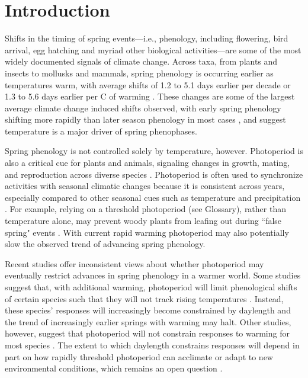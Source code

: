 \documentclass{article}
\begin{document}
\section*{Introduction}
\par Shifts in the timing of spring events---i.e., phenology, including flowering, bird arrival, egg hatching and myriad other biological activities---are some of the most widely documented signals of climate change. Across taxa, from plants and insects to mollusks and mammals, spring phenology is occurring earlier as temperatures warm, with average shifts of 1.2 to 5.1 days earlier per decade \citep{bradley1999,parmesan2003, root2003,poloczanska2013} or 1.3 to 5.6 days earlier per \degree C of warming \citep{Wolkovich:2012n,polgar2013}. These changes are some of the largest average climate change induced shifts observed, with early spring phenology shifting more rapidly than later season phenology in most cases \citep{bradley1999,menzel2006}, and suggest temperature is a major driver of spring phenophases.

\par Spring phenology is not controlled solely by temperature, however. Photoperiod is also a critical cue for plants and animals, signaling changes in growth, mating, and reproduction across diverse species \citep[e.g.,][]{Howe:1996,flynn2018,solbakken1994,mcallan2006,lagercrantz2009}. Photoperiod is often used to synchronize activities with seasonal climatic changes \citep[e.g.,][]{Hsu:2011,Singh:2017,Basler:2012} because it is consistent across years, especially compared to other seasonal cues such as temperature and precipitation \citep{saikkonen2012}. For example, relying on a threshold photoperiod (see Glossary), rather than temperature alone, may prevent woody plants from leafing out during ``false spring" events \citep[unusually warm periods during winter that are followed by a return of cold temperatures,][] {Gu2008}. With current rapid warming photoperiod may also potentially slow the observed trend of advancing spring phenology. 

\par Recent studies offer inconsistent views about whether photoperiod may eventually restrict advances in spring phenology in a warmer world. Some studies suggest that, with additional warming, photoperiod will limit phenological shifts of certain species such that they will not track rising temperatures \citep[e.g., by leafing out earlier in the spring,][]{koerner2010b,way2015}. Instead, these species' responses will increasingly become constrained by daylength and the trend of increasingly earlier springs with warming may halt. Other studies, however, suggest that photoperiod will not constrain responses to warming for most species \citep{zohner2016,chuine2010}. The extent to which daylength constrains responses will depend in part on how rapidly threshold photoperiod can acclimate or adapt to new environmental conditions, which remains an open question \citep{grevstad2015}.
\end{document}
